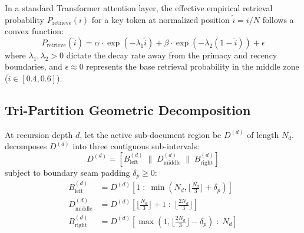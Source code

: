 In a standard Transformer attention layer, the effective empirical retrieval probability $P_{\text{retrieve}}(i)$ for a key token at normalized position $\hat{i} = i/N$ follows a convex function:
\begin{equation}
    P_{\text{retrieve}}(\hat{i}) = \alpha \cdot \exp(-\lambda_1 \hat{i}) + \beta \cdot \exp(-\lambda_2 (1 - \hat{i})) + \epsilon
\end{equation}
where $\lambda_1, \lambda_2 > 0$ dictate the decay rate away from the primacy and recency boundaries, and $\epsilon \approx 0$ represents the base retrieval probability in the middle zone ($\hat{i} \in [0.4, 0.6]$).

\subsection{Tri-Partition Geometric Decomposition}
At recursion depth $d$, let the active sub-document region be $D^{(d)}$ of length $N_d$. \RBER{} decomposes $D^{(d)}$ into three contiguous sub-intervals:
\begin{equation}
    D^{(d)} = \left[ B_{\text{left}}^{(d)} \;\parallel\; D_{\text{middle}}^{(d)} \;\parallel\; B_{\text{right}}^{(d)} \right]
\end{equation}
subject to boundary seam padding $\delta_p \ge 0$:
\begin{align}
    B_{\text{left}}^{(d)} &= D^{(d)}\left[1 \;:\; \min\left(N_d, \lfloor \tfrac{N_d}{3} \rfloor + \delta_p\right)\right] \\
    D_{\text{middle}}^{(d)} &= D^{(d)}\left[\lfloor \tfrac{N_d}{3} \rfloor + 1 \;:\; \lfloor \tfrac{2N_d}{3} \rfloor\right] \\
    B_{\text{right}}^{(d)} &= D^{(d)}\left[\max\left(1, \lfloor \tfrac{2N_d}{3} \rfloor - \delta_p\right) \;:\; N_d\right]
\end{align}

